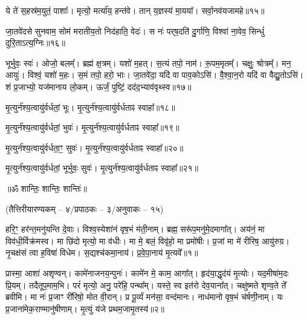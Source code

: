 ये ते॑ स॒हस्र॑म॒युतं॒ पाशाः᳚।   मृत्यो॒ मर्त्या॑य॒ हन्त॑वे।
तान् य॒ज्ञस्य॑ मा॒यया᳚।   सर्वा॒नव॑यजामहे॥१५॥ 

जा॒तवे॑दसे सुनवाम॒ सोम॑ मरातीय॒तो निद॑हाति॒ वेदः॑।
स नः॑ पर्‌ष॒दति॑ दु॒र्गाणि॒ विश्वा॑ ना॒वेव॒ सिन्धुं॑ दुरि॒ताऽत्य॒ग्निः॥१६॥ 

भूर्भुवः॒ स्वः॑।
ओजो॒ बलम्᳚।
ब्रह्म॑ क्ष॒त्रम्।
यशो॑ म॒हत्।
स॒त्यं तपो॒ नाम॑।
रू॒पम॒मृतम्᳚।
चक्षुः॒ श्रोत्रम्᳚।
मन॒ आयुः॑।
विश्वं॒ यशो॑ म॒हः।
स॒मं तपो॒ हरो॒ भाः।
जा॒तवे॑दा॒ यदि॑ वा पाव॒कोऽसि॑।
वै॒श्वा॒न॒रो यदि॑ वा वैद्यु॒तोऽसि॑।
शं प्र॒जाभ्यो॒ यज॑मानाय लो॒कम्।
ऊर्जं॒ पुष्टिं॒ दद॑द॒भ्याव॑वृथ्स्व॥१७॥ 
   
मृ॒त्युर्न॑श्य॒त्वायु॑र्वर्धतां॒ भूः। मृ॒त्युर्न॑श्य॒त्वायु॑र्वर्धताꣴ स्वाहा᳚॥१८॥ 

मृ॒त्युर्न॑श्य॒त्वायु॑र्वर्धतां॒ भुवः॑। मृ॒त्युर्न॑श्य॒त्वायु॑र्वर्धताꣴ स्वाहा᳚॥१९॥ 

मृ॒त्युर्न॑श्य॒त्वायु॑र्वर्धता॒ꣳ॒ सुवः॑। मृ॒त्युर्न॑श्य॒त्वायु॑र्वर्धताꣴ स्वाहा᳚॥२०॥  

मृ॒त्युर्न॑श्य॒त्वायु॑र्वर्धतां॒ भूर्भुवः॒ सुवः॑। मृ॒त्युर्न॑श्य॒त्वायु॑र्वर्धताꣴ स्वाहा᳚॥२१॥  

\centerline{॥ॐ शान्तिः॒ शान्तिः॒ शान्तिः॑॥}
\let\parskip\oldparskip

\closesection
\centerline{\scriptsize (तैत्तिरीयारण्यकम् – ४/प्रपाठकः – ३/अनुवाकः – १५)}
हरि॒ꣳ॒ हर॑न्त॒मनु॑यन्ति दे॒वाः। विश्व॒स्येशा॑नं वृष॒भं म॑ती॒नाम्। ब्रह्म॒ सरू॑प॒मनु॑मे॒दमागा᳚त्। अय॑नं॒ मा विव॑धी॒र्विक्र॑मस्व। मा छि॑दो मृत्यो॒ मा व॑धीः। मा मे॒ बलं॒  विवृ॑हो॒ मा प्रमो॑षीः। प्र॒जां मा मे॑ रीरिष॒ आयु॑रुग्र। नृ॒चक्ष॑सं त्वा ह॒विषा॑ विधेम। स॒द्यश्च॑कमा॒नाय॑। प्र॒वे॒पा॒नाय॑ मृ॒त्यवे᳚॥१॥

प्रास्मा॒ आशा॑ अशृण्वन्। कामे॑नाजनय॒न्पुनः॑। कामे॑न मे॒ काम॒ आगा᳚त्। हृद॑या॒द्धृद॑यं मृ॒त्योः। यद॒मीषा॑म॒दः प्रि॒यम्। तदैतूप॒माम॒भि। परं॑ मृत्यो॒ अनु॒ परे॑हि॒ पन्था᳚म्। यस्ते॒ स्व इत॑रो देव॒याना᳚त्। चक्षु॑ष्मते शृण्व॒ते ते᳚ ब्रवीमि। मा नः॑ प्र॒जाꣳ री॑रिषो॒ मोत वी॒रान्। प्र पू॒र्व्यं मन॑सा॒ वन्द॑मानः। नाध॑मानो वृष॒भं च॑र्\mbox{}षणी॒नाम्। यः प्र॒जाना॑मेक॒राण्मानु॑षीणाम्। मृ॒त्युं य॑जे प्रथम॒जामृ॒तस्य॑॥२॥